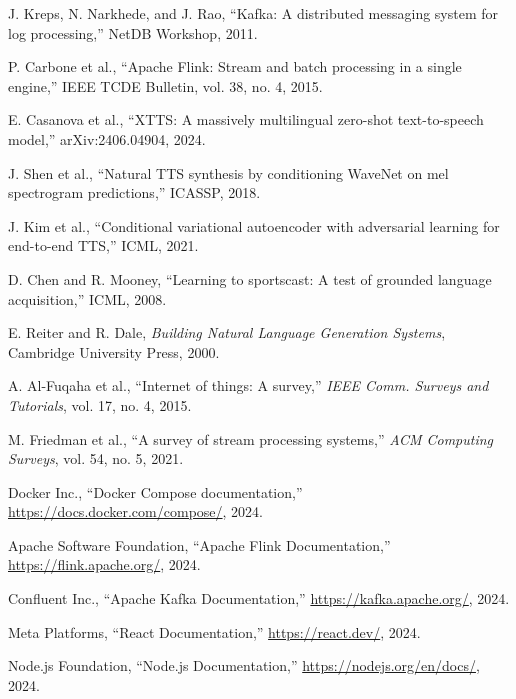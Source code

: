 \documentclass[12pt,a4paper]{article}
\begin{document}
\begin{enumerate}[label={[\arabic*]}]
\item J. Kreps, N. Narkhede, and J. Rao, ``Kafka: A distributed messaging system for log processing,'' NetDB Workshop, 2011.
\item P. Carbone et al., ``Apache Flink: Stream and batch processing in a single engine,'' IEEE TCDE Bulletin, vol. 38, no. 4, 2015.
\item E. Casanova et al., ``XTTS: A massively multilingual zero-shot text-to-speech model,'' arXiv:2406.04904, 2024.
\item J. Shen et al., ``Natural TTS synthesis by conditioning WaveNet on mel spectrogram predictions,'' ICASSP, 2018.
\item J. Kim et al., ``Conditional variational autoencoder with adversarial learning for end-to-end TTS,'' ICML, 2021.
\item D. Chen and R. Mooney, ``Learning to sportscast: A test of grounded language acquisition,'' ICML, 2008.
\item E. Reiter and R. Dale, \textit{Building Natural Language Generation Systems}, Cambridge University Press, 2000.
\item A. Al-Fuqaha et al., ``Internet of things: A survey,'' \textit{IEEE Comm. Surveys and Tutorials}, vol. 17, no. 4, 2015.
\item M. Friedman et al., ``A survey of stream processing systems,'' \textit{ACM Computing Surveys}, vol. 54, no. 5, 2021.
\item Docker Inc., ``Docker Compose documentation,'' \url{https://docs.docker.com/compose/}, 2024.
\item Apache Software Foundation, ``Apache Flink Documentation,'' \url{https://flink.apache.org/}, 2024.
\item Confluent Inc., ``Apache Kafka Documentation,'' \url{https://kafka.apache.org/}, 2024.
\item Meta Platforms, ``React Documentation,'' \url{https://react.dev/}, 2024.
\item Node.js Foundation, ``Node.js Documentation,'' \url{https://nodejs.org/en/docs/}, 2024.
\end{enumerate}
\end{document}
